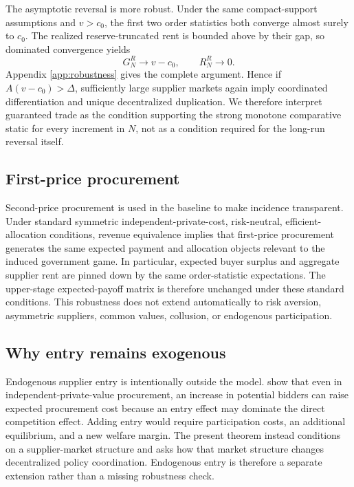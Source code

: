 The asymptotic reversal is more robust. Under the same compact-support assumptions and $v>c_0$, the first two order statistics both converge almost surely to $c_0$. The realized reserve-truncated rent is bounded above by their gap, so dominated convergence yields
\begin{equation}
G_N^R\to v-c_0,
\qquad
R_N^R\to0.
\label{eq:reserve-limits}
\end{equation}
Appendix \ref{app:robustness} gives the complete argument. Hence if $A(v-c_0)>\Delta$, sufficiently large supplier markets again imply coordinated differentiation and unique decentralized duplication. We therefore interpret guaranteed trade as the condition supporting the strong monotone comparative static for every increment in $N$, not as a condition required for the long-run reversal itself.

\subsection{First-price procurement}

Second-price procurement is used in the baseline to make incidence transparent. Under standard symmetric independent-private-cost, risk-neutral, efficient-allocation conditions, revenue equivalence implies that first-price procurement generates the same expected payment and allocation objects relevant to the induced government game. In particular, expected buyer surplus and aggregate supplier rent are pinned down by the same order-statistic expectations. The upper-stage expected-payoff matrix is therefore unchanged under these standard conditions. This robustness does not extend automatically to risk aversion, asymmetric suppliers, common values, collusion, or endogenous participation.

\subsection{Why entry remains exogenous}

Endogenous supplier entry is intentionally outside the model. \citet{LiZheng2009} show that even in independent-private-value procurement, an increase in potential bidders can raise expected procurement cost because an entry effect may dominate the direct competition effect. Adding entry would require participation costs, an additional equilibrium, and a new welfare margin. The present theorem instead conditions on a supplier-market structure and asks how that market structure changes decentralized policy coordination. Endogenous entry is therefore a separate extension rather than a missing robustness check.

